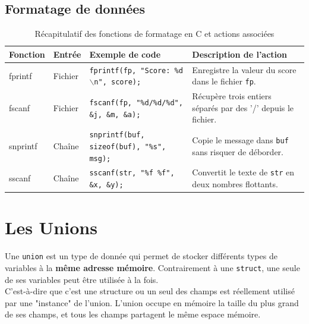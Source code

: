 \documentclass{article}
\begin{document}
\subsection{Formatage de données}

\begin{table}[h]
\centering
\begin{tabular}{|l|l|p{8cm}|p{6cm}|}
\hline
\textbf{Fonction} & \textbf{Entrée} & \textbf{Exemple de code} & \textbf{Description de l'action} \\ \hline
fprintf & Fichier & \texttt{fprintf(fp, "Score: \%d $\backslash$n", score);} & Enregistre la valeur du score dans le fichier \texttt{fp}. \\
\hline
fscanf & Fichier & \texttt{fscanf(fp, "\%d/\%d/\%d", \&j, \&m, \&a);} & Récupère trois entiers séparés par des '/' depuis le fichier. \\
\hline
snprintf & Chaîne & \texttt{snprintf(buf, sizeof(buf), "\%s", msg);} & Copie le message dans \texttt{buf} sans risquer de déborder. \\
\hline
sscanf & Chaîne & \texttt{sscanf(str, "\%f \%f", \&x, \&y);} & Convertit le texte de \texttt{str} en deux nombres flottants. \\
\hline
\end{tabular}
\caption{Récapitulatif des fonctions de formatage en C et actions associées}
\label{tab:recap_fonctions_c}
\end{table}


\section{Les Unions}

Une \texttt{union} est un type de donnée qui permet de stocker différents types de variables à la \textbf{même adresse mémoire}. Contrairement à une \texttt{struct}, une seule de ses variables peut être utilisée à la fois.\\
C'est-à-dire que c'est une structure ou un seul des champs est réellement utilisé par une "instance" de l'union. L'union occupe en mémoire la taille du plus grand de ses champs, et tous les champs partagent le même espace mémoire.
\end{document}
